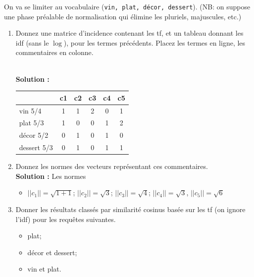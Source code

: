 \documentclass[10pt,a4paper]{article}
\newenvironment{solution}[0]{
~\\ \color{red} \textbf{Solution : }\color{black}}{%
}
\begin{document}
\bigskip

On va se limiter au vocabulaire (\texttt{vin, plat, décor, dessert}).
(NB: on suppose
     une phase préalable de normalisation qui élimine les pluriels, majuscules, etc.)

\begin{enumerate}
   \item Donnez une matrice d'incidence contenant les tf, 
      et un tableau donnant les idf (sans le $\log$), pour les  termes précédents. Placez
      les termes en ligne, les commentaires en colonne.

\begin{solution}
\begin{center}
\begin{tabular}{l|c|c|c|c|c}
            & \textbf{c1} & \textbf{c2} & \textbf{c3} &\textbf{c4}&\textbf{c5} \\ \hline  
   vin  5/4   & 1           & 1           & 2           & 0         & 1\\
   plat 5/3  & 1           & 0           & 0           & 1         & 2\\
   décor 5/2  & 0           & 1           & 0           & 1         & 0\\
   dessert 5/3  & 0           & 1           & 0           & 1         & 1\\\hline
   \end{tabular}
\end{center}
\end{solution}

  \item Donnez les normes des vecteurs représentant ces commentaires.
\begin{solution}
Les normes
\begin{itemize}
  \item $||c_1|| = \sqrt{1+ 1}$; $||c_2|| = \sqrt{3}$; $||c_3|| = \sqrt{4}$; 
    $||c_4|| = \sqrt{3}$, $||c_5|| = \sqrt{6}$  
\end{itemize}
\end{solution}
  
  \item Donner les résultats classés par similarité cosinus basée sur les tf 
  (on ignore l'idf) pour les requêtes suivantes. 
  
  \begin{itemize}
    \item plat;
    \item décor et dessert;
    \item vin et plat.
  \end{itemize}


\end{enumerate}
\end{document}
